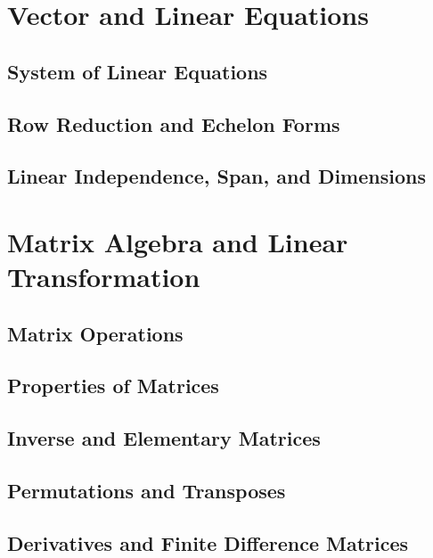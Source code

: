 \documentclass[11pt]{article}
\begin{document}
\newcommand{\cv}[2]{
    \begin{bmatrix}
        #1 \\ #2
    \end{bmatrix}
}
\newcommand{\m}[4]{
    \begin{bmatrix}
        #1 & #3 \\
        #2 & #4
    \end{bmatrix}
}
\pagestyle{plain}
\begin{center}
    \tableofcontents
\end{center}
\newpage
\setcounter{page}{1}
\pagestyle{fancy}
\section{Vector and Linear Equations}
\subsection{System of Linear Equations}
\subsection{Row Reduction and Echelon Forms}
\subsection{Linear Independence, Span, and Dimensions}

\section{Matrix Algebra and Linear Transformation}
\subsection{Matrix Operations}
\subsection{Properties of Matrices}
\subsection{Inverse and Elementary Matrices}
\subsection{Permutations and Transposes}
\subsection{Derivatives and Finite Difference Matrices}
\end{document}
